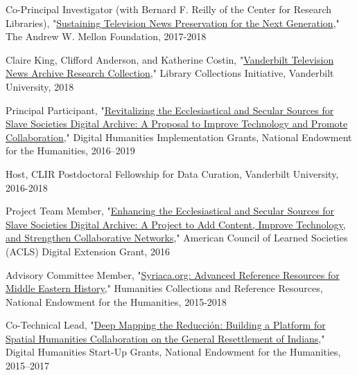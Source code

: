 \documentclass[10pt]{res} %
\begin{document}
\begin{resume}
\begin{hangparas}{.25in}{1}Co-Principal Investigator (with Bernard F. Reilly of the Center for Research Libraries), "\href{https://news.vanderbilt.edu/2017/09/27/workshop-will-chart-the-future-of-television-news-preservation/}{Sustaining Television News Preservation for the Next Generation}," The Andrew W. Mellon Foundation, 2017-2018\end{hangparas}

\begin{hangparas}{.25in}{1}Claire King, Clifford Anderson, and Katherine Costin, "\href{https://news.vanderbilt.edu/2018/05/16/10-faculty-proposals-funded-through-new-library-collections-initiative}{Vanderbilt Television News Archive Research Collection}," Library Collections Initiative, Vanderbilt University, 2018\end{hangparas}

\begin{hangparas}{.25in}{1}Principal Participant, "\href{https://securegrants.neh.gov/publicquery/main.aspx?f=1\&gn=HK-250720-16}{Revitalizing the Ecclesiastical and Secular Sources for Slave Societies Digital Archive: A Proposal to Improve Technology and
Promote Collaboration}," Digital Humanities Implementation Grants, National Endowment for the Humanities, 2016–2019\end{hangparas}

\begin{hangparas}{.25in}{1}Host, CLIR Postdoctoral Fellowship for Data Curation, Vanderbilt University, 2016-2018\end{hangparas}

\begin{hangparas}{.25in}{1}Project Team Member, "\href{http://www.acls.org/research/fellow.aspx?cid=f125fd4b-41a1-e211-b90d-000c29a3451a}{Enhancing the Ecclesiastical and Secular Sources for Slave Societies Digital Archive: A Project to Add Content, Improve Technology, and Strengthen Collaborative Networks}," American Council of Learned Societies (ACLS) Digital Extension Grant, 2016\end{hangparas}

\begin{hangparas}{.25in}{1}Advisory Committee Member, "\href{https://securegrants.neh.gov/PublicQuery/main.aspx?f=1\&gn=PW-228209-15}{Syriaca.org: Advanced Reference Resources for Middle Eastern History}," Humanities Collections and Reference Resources, National Endowment for the Humanities, 2015-2018\end{hangparas}  
\begin{hangparas}{.25in}{1}Co-Technical Lead, "\href{https://securegrants.neh.gov/PublicQuery/main.aspx?f=1\&gn=HD-229071-15}{Deep Mapping the Reducción: Building a Platform for Spatial Humanities Collaboration on the General Resettlement of Indians}," Digital Humanities Start-Up Grants, National Endowment for the Humanities, 2015–2017\end{hangparas} 


\end{resume}
\end{document}
